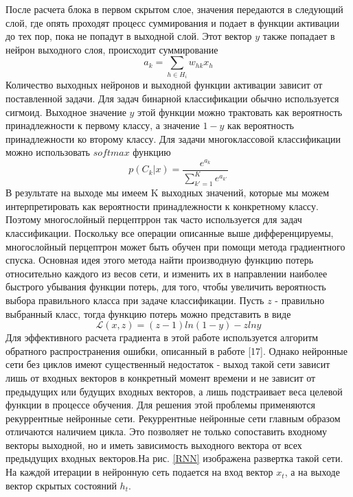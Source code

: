     После расчета блока в первом скрытом слое, значения передаются в следующий слой, где опять проходят процесс суммирования и подает в функции активации до тех пор, пока не попадут в выходной слой. Этот вектор $y$ также попадает в нейрон выходного слоя, происходит суммирование
    \begin{equation}
    a_{k}=\sum_{h\in  H_{i}}w_{hk}x_{h}
    \end{equation}
    Количество выходных нейронов и выходной функции активации зависит от поставленной задачи. Для задач бинарной классификации обычно используется сигмоид. Выходное значение $y$ этой функции можно трактовать как вероятность принадлежности к первому классу, а значение $1-y$ как вероятность принадлежности ко второму классу.
    Для задачи многоклассовой классификации можно использовать $softmax$ функцию
    \begin{equation}
    p(C_{k}|x)=\frac{e^{a_{k}}}{\sum_{k{}'=1}^{K}e^{a_{k{}'}}}
    \end{equation}
    В результате на выходе мы имеем K выходных значений, которые мы можем интерпретировать как вероятности принадлежности к конкретному классу. Поэтому многослойный перцептррон так часто используется для задач классификации. Поскольку все операции описанные выше дифференцируемы, многослойный перцептрон может быть обучен при помощи метода градиентного спуска. Основная идея этого метода найти производную функцию потерь относительно каждого из весов сети, и изменить их в направлении наиболее быстрого убывания функции потерь, для того, чтобы увеличить вероятность выбора правильного класса при задаче классификации. Пусть $z$ - правильно выбранный класс, тогда функцию потерь можно представить в виде
    \begin{equation}
    \mathcal{L}(x,z) = (z-1)ln(1-y)-zlny
    \end{equation}
    Для эффективного расчета градиента в этой работе используется алгоритм обратного распространения ошибки, описанный в работе [17]. Однако нейронные сети без циклов имеют существенный недостаток - выход такой сети зависит лишь от входных векторов в конкретный момент времени и не зависит от предыдущих или будущих входных векторов, а лишь подстраивает веса целевой функции в процессе обучения. Для решения этой проблемы применяются рекуррентные нейронные сети.
    Рекуррентные нейронные сети главным образом отличаются наличием цикла. Это позволяет не только сопоставить входному векторы выходной, но и иметь зависимость выходного вектора от всех предыдущих входных векторов.На рис. \ref{RNN} изображена развертка такой сети. На каждой итерации в нейронную сеть подается на вход вектор $x_{t}$, а на выходе вектор скрытых состояний $h_{t}$.
